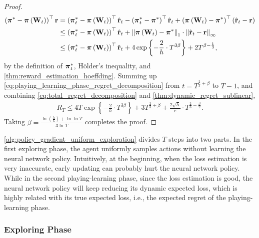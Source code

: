 \begin{proof}
\begin{equation}
\begin{split}
    \left( {{\boldsymbol{\pi}}^*} - {\boldsymbol{\pi}}\left( {\mathbf{W}}_t \right) \right)^\top {\mathbf{r}} &= \left( {{\boldsymbol{\pi}}_t^*} - {\boldsymbol{\pi}}\left( {\mathbf{W}}_t \right) \right)^\top \hat{{\mathbf{r}}}_t - \left( {{\boldsymbol{\pi}}_t^*} - {{\boldsymbol{\pi}}^*} \right)^\top \hat{{\mathbf{r}}}_t + \left( {\boldsymbol{\pi}}\left( {\mathbf{W}}_t \right) - {{\boldsymbol{\pi}}^*}\right)^\top \left( \hat{{\mathbf{r}}}_t - {\mathbf{r}} \right) \\
    &\le \left( {{\boldsymbol{\pi}}_t^*} - {\boldsymbol{\pi}}\left( {\mathbf{W}}_t \right) \right)^\top \hat{{\mathbf{r}}}_t  + \left\| {\boldsymbol{\pi}}\left( {\mathbf{W}}_t \right) - {\boldsymbol{\pi}}^* \right\|_1 \cdot \left\| \hat{{\mathbf{r}}}_t - {\mathbf{r}} \right\|_\infty  \\
    &\le \left( {{\boldsymbol{\pi}}_t^*} - {\boldsymbol{\pi}}\left( {\mathbf{W}}_t \right) \right)^\top \hat{{\mathbf{r}}}_t  + 4 \exp\left\{ - \frac{2}{h} \cdot  T^{3\beta} \right\} + 2 T^{\beta - \frac{1}{3}},
\end{split}
\end{equation}
by the definition of ${\boldsymbol{\pi}}_t^*$, H{\"o}lder's inequality, and \cref{thm:reward_estimation_hoeffding}. Summing up \cref{eq:playing_learning_phase_regret_decomposition} from $t = T^{\frac{2}{3} + \beta}$ to $T - 1$, and
combining \cref{eq:total_regret_decomposition} and \cref{thm:dynamic_regret_sublinear},
\begin{equation*}
\begin{split}
    R_T \le  4 T \exp\left\{ - \frac{2}{h} \cdot  T^{3\beta} \right\} + 3 T^{\frac{2}{3} + \beta} + \frac{2 \sqrt{h}}{ c} \cdot T^{\frac{2}{3} - \frac{\beta}{2}}.
\end{split}
\end{equation*}
Taking $\beta = \frac{ \ln{\left(\frac{h}{6}\right) + \ln{\ln{T}} } }{ 3 \ln{T}} $ completes the proof.
\end{proof}

\cref{alg:policy_gradient_uniform_exploration} divides $T$ steps into two parts. In the first exploring phase, the agent uniformly samples actions without learning the neural network policy. Intuitively, at the beginning, when the loss estimation is very inaccurate, early updating can probably hurt the neural network policy.  While in the second playing-learning phase, since the loss estimation is good, the neural network policy will keep reducing its dynamic expected loss, which is highly related with its true expected loss, i.e., the expected regret of the playing-learning phase.

\subsubsection{Exploring Phase}
\label{subsubsec:exploring_phase}

